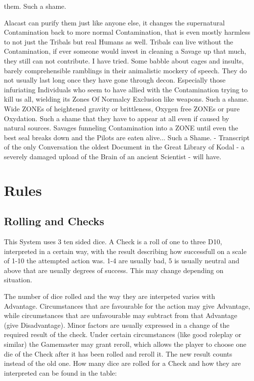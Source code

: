 \documentclass{article}
\begin{document}
    them. Such a shame. \par
    Alacast can purify them just like anyone else, it changes the supernatural Contamination back to more normal
    Contamination, that is even mostly harmless to not just the Tribals but real Humans as well. Tribals can live without
    the Contamination, if ever someone would invest in cleaning a Savage up that much, they still can not contribute.
    I have tried. Some babble about cages and insults, barely comprehensible ramblings in their animalistic mockery of
    speech. They do not usually last long once they have gone through decon. Especially those infuriating Individuals
    who seem to have allied with the Contamination trying to kill us all, wielding its Zones Of Normalcy Exclusion like
    weapons. Such a shame. Wide ZONEs of heightened gravity or brittleness, Oxygen free ZONEs or pure Oxydation. Such a
    shame that they have to appear at all even if caused by natural sources. Savages funneling Contamination into a ZONE
    until even the best seal breaks down and the Pilots are eaten alive... Such a Shame.\newline
    \newline
    - Transcript of the only Conversation the oldest Document in the Great Library of Kodal - a severely damaged
    upload of the Brain of an ancient Scientist - will have.\newpage

    \section{Rules}
    \subsection{Rolling and Checks}

    This System uses 3 ten sided dice. A Check is a roll of one to three D10, interpreted
    in a certain way, with the result describing how successfull on a scale of 1-10 the attempted action was.
    1-4 are usually bad, 5 is usually neutral and above that are usually degrees of success.
    This may change depending on situation. \par
    The number of dice rolled and the way they are interpeted varies with Advantage.
    Circumstances that are favourable for the action may give Advantage, while circumstances
    that are unfavourable may subtract from that Advantage (give Disadvantage).
    Minor factors are usually expressed in a change of the required result of the check. Under certain circumstances (like
    good roleplay or similar) the Gamemaster may grant reroll, which allows the player to choose one die of the Check after
    it has been rolled and reroll it. The new result counts instead of the old one. \newline\newline
    How many dice are rolled for a Check and how they are interpreted can be found in the table:\par
\end{document}
